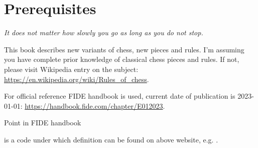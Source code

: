 

\chapter*{Prerequisites}
\label{ch:Prerequisites}

\begin{flushright}
\parbox{0.7\textwidth}{
\emph{It does not matter how slowly you go as long as you do not stop.\newline
{} } }
\end{flushright}

\noindent
This book describes new variants of chess, new pieces and rules. I'm assuming you
have complete prior knowledge of classical chess pieces and rules. If not, please
visit Wikipedia entry on the subject:\newline
\href{https://en.wikipedia.org/wiki/Rules\_of\_chess}{https://en.wikipedia.org/wiki/Rules\_of\_chess}.

For official reference \hypertarget{sec:Prerequisites/FIDE Handbook}{FIDE handbook}
is used, current date of publication is 2023-01-01:\newline
\href{https://handbook.fide.com/chapter/E012023}{https://handbook.fide.com/chapter/E012023}.

\hypertarget{sec:Prerequisites/FIDE point}{Point in FIDE handbook} is a code
under which definition can be found on above website, e.g. .

\clearpage %
